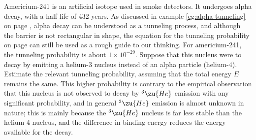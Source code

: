 Americium-241 is an artificial isotope used in smoke detectors. It undergoes alpha decay, with a half-life of 432 years.
As discussed in example \ref{eg:alpha-tunneling} on page \pageref{eg:alpha-tunneling}, alpha decay can be understood
as a tunneling process, and although the barrier is not rectangular in shape, the equation for the tunneling
probability on page \pageref{tunneling-probability} can still be used as a rough guide to our thinking.
For americium-241, the tunneling probability is about $1\times10^{-29}$. %
Suppose that this nucleus were to decay by emitting a helium-3 nucleus instead of an alpha particle (helium-4).
Estimate the relevant tunneling probability, assuming that the total energy $E$ remains the same.
This higher probability is contrary to the empirical observation that this
nucleus is not observed to decay by ${}^3\zu{He}$ emission with any significant probability, and in general
${}^3\zu{He}$ emission is almost unknown in nature; this is mainly because the ${}^3\zu{He}$ nucleus is far less stable
than the helium-4 nucleus, and the difference in binding energy reduces the energy available for the decay.
